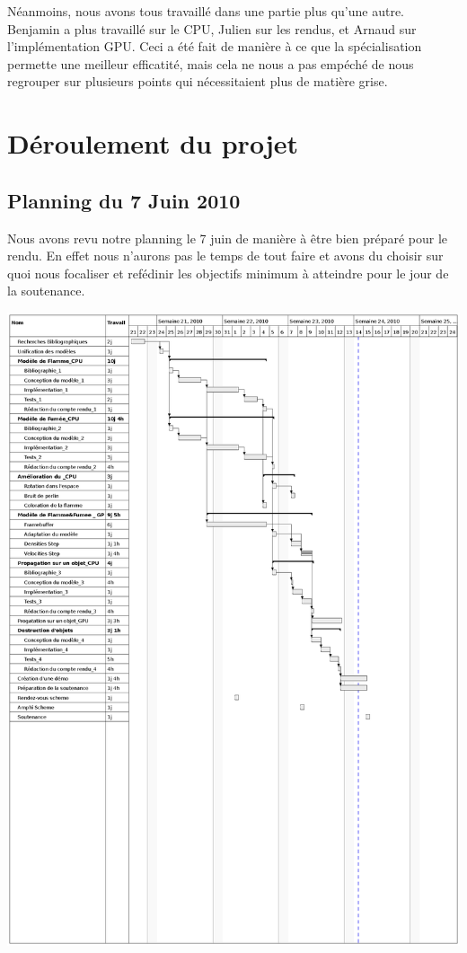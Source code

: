 \documentclass[a4paper,10pt]{article}
\begin{document}
Néanmoins, nous avons tous travaillé dans une partie plus qu'une autre.
Benjamin a plus travaillé sur le CPU, Julien sur les rendus, et Arnaud sur l'implémentation GPU.
Ceci a été fait de manière à ce que la spécialisation permette une meilleur efficatité, mais cela ne nous
a pas empéché de nous regrouper sur plusieurs points qui nécessitaient plus de matière grise.

\section{Déroulement du projet}
\subsection{Planning du 7 Juin 2010}

    Nous avons revu notre planning le 7 juin de manière à être bien préparé pour le rendu.
    En effet nous n'aurons pas le temps de tout faire et avons du choisir sur quoi nous
    focaliser et refédinir les objectifs minimum à atteindre pour le jour de la soutenance.

        \includegraphics[scale=0.8]{../Planning/GANTT2.ps}
        
\end{document}
